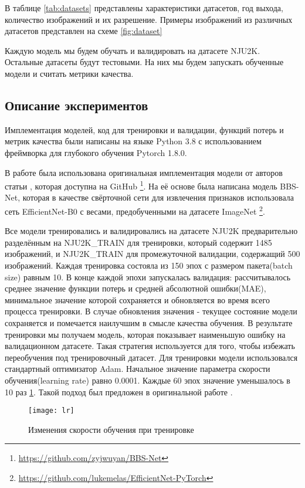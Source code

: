 В таблице \ref{tab:datasets} представлены характеристики датасетов, год выхода, количество изображений и их разрешение.
Примеры изображений из различных датасетов представлен на схеме \ref{fig:dataset}


Каждую модель мы будем обучать и валидировать на датасете NJU2K. Остальные датасеты будут тестовыми. На них мы будем
запускать обученные модели и считать метрики качества.

\subsection{Описание экспериментов}

Имплементация моделей, код для тренировки и валидации, функций потерь и метрик качества были написаны на языке Python 3.8
с использованием фреймворка для глубокого обучения Pytorch 1.8.0\cite{Pytorch}.


В работе была использована оригинальная имплементация модели от авторов статьи \cite{BBS}, 
которая доступна на GitHub \footnote{\url{https://github.com/zyjwuyan/BBS-Net}}.
На её основе была написана модель BBS-Net, которая в качестве свёрточной сети для извлечения признаков
использовала сеть EfficientNet-B0 \cite{Efficientnet} с весами, предобученными на датасете ImageNet
\footnote{\url{https://github.com/lukemelas/EfficientNet-PyTorch}}.


Все модели тренировались и валидировались на датасете NJU2K предварительно разделённым на NJU2K\_TRAIN для тренировки, 
который содержит 1485 изображений, и NJU2K\_TRAIN для промежуточной валидации, содержащий 500 изображений.
Каждая тренировка состояла из 150 эпох с размером пакета(batch size) равным 10. В конце каждой эпохи запускалась валидация: рассчитывалось среднее
значение функции потерь и средней абсолютной ошибки(MAE), минимальное значение которой сохраняется и обновляется во время
всего процесса тренировки. В случае обновления значения - текущее состояние модели сохраняется и помечается наилучшим в смысле качества обучения.
В результате тренировки мы получаем модель, которая показывает наименьшую ошибку на валидационном датасете. Такая стратегия используется для того,
чтобы избежать переобучения под тренировочный датасет. 
Для тренировки модели использовался стандартный оптимизатор Adam\cite{Adam}. Начальное значение параметра скорости обучения(learning rate) 
равно 0.0001. Каждые 60 эпох значение уменьшалось в 10 раз \ref{fig:lr}. Такой подход был предложен в оригинальной работе \cite{BBS}.


\begin{figure}[h]
    \centering
    \texttt{[image: lr]}
    \caption{Изменения скорости обучения при тренировке}
    \label{fig:lr}
\end{figure}

